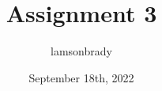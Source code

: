 \usepackage[utf8]{inputenc}

\title{Assignment 3}
\author{lamsonbrady }
\date{September 18th, 2022}

\usepackage{parskip}

\usepackage{fancyhdr}
\pagestyle{fancy}

\usepackage{amsmath}
\usepackage{amssymb}

\newcommand{\psmall}[1]{
	\left(\begin{smallmatrix}
		#1
	\end{smallmatrix} \right)
}

\newcommand{\genericmat}[2]{
	\ensuremath{
		\begin{#1matrix}
			#2
		\end{#1matrix}
	}
}

\newcommand{\genericvec}{
	\ensuremath{
		\left\{\vec{e_1}, \vec{e_2}, \dots, \vec{e_n} \right\}
	}
}

\newcommand{\bb}{\mathbb}
\newcommand{\R}{\mathbb{R}}
\renewcommand{\P}{\mathbb{P}}
\newcommand{\Z}{\mathbb{Z}}

\newcommand*{\myprime}{^{\prime}\mkern-1.2mu}
\newcommand*{\mydprime}{^{\prime\prime}\mkern-1.2mu}
\newcommand*{\mytrprime}{^{\prime\prime\prime}\mkern-1.2mu}

